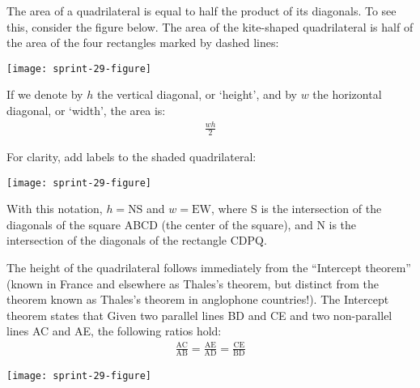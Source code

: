 \documentclass[12pt]{article}
\begin{document}
\begin{answer}
The area of a quadrilateral is equal to half the product of its diagonals. 
To see this, consider the figure below. The area of the kite-shaped quadrilateral is half of the area of the four rectangles marked by dashed lines:
\begin{center}
\texttt{[image: sprint-29-figure]}
\end{center}
If we denote by $h$ the vertical diagonal, or `height', and by $w$ the horizontal diagonal, or `width', the area is:
\begin{align*}
\frac{wh}{2}
\end{align*}

For clarity, add labels to the shaded quadrilateral: 
\begin{center}
\texttt{[image: sprint-29-figure]}
\end{center}
With this notation, $h=\text{NS}$ and $w=\text{EW}$, where S is the intersection of the diagonals of the square ABCD (the center of the square), and N is the intersection of the diagonals of the rectangle CDPQ.


The height of the quadrilateral follows immediately from the ``Intercept theorem'' (known in France and elsewhere as Thales's theorem, but distinct from the theorem known as Thales's theorem in anglophone countries!). The Intercept theorem states that Given two parallel lines BD and CE and two non-parallel lines AC and AE, the following ratios hold:
\begin{align*}
\frac{\text{AC}}{\text{AB}} 
  = \frac{\text{AE}}{\text{AD}} 
  = \frac{\text{CE}}{\text{BD}} 
\end{align*} 
\begin{center}
\texttt{[image: sprint-29-figure]}
\end{center}


\end{answer}
\end{document}
